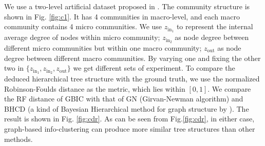 We use a two-level artificial dataset proposed in \cite{RN22}. 
The community structure is shown in Fig. \ref{fig:c1}. It has 4 communities in macro-level, and each macro community contains 4 micro communities. We use $z_{\mathrm{in}_1}$ to represent the internal average degree of nodes within micro community; $z_{\mathrm{in}_2}$ as node degree between different micro communities but within one macro community; $z_{\mathrm{out}}$ as node degree between different macro communities. By varying one and fixing the other two in $\{z_{\mathrm{in}_1}, z_{\mathrm{in}_2}, z_{\mathrm{out}} \}$ we get different sets of experiment.
To compare the deduced hierarchical tree structure with the ground truth, we use the normalized Robinson-Foulds distance as the metric, which lies within $[0,1]$. We compare the RF distance of GBIC with that of GN (Girvan-Newman algorithm) and BHCD (a kind of Bayesian Hierarchical method for graph structure by \cite{RN23}). The result is shown in Fig. \ref{fig:cdr}. As can be seen from Fig.\ref{fig:cdr}, in either case, graph-based info-clustering can produce more similar tree structures than other methods.
